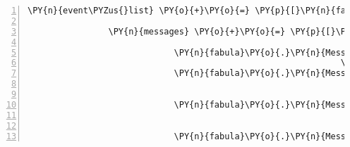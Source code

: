 \begin{Verbatim}[commandchars=\\\{\},numbers=left,firstnumber=1,stepnumber=1]
                \PY{n}{event\PYZus{}list} \PY{o}{+}\PY{o}{=} \PY{p}{[}\PY{n}{fabula}\PY{o}{.}\PY{n}{PerceptionEvent}\PY{p}{(}\PY{n}{identifier}\PY{o}{=}\PY{n}{ID\PYZus{}KUNI}\PY{p}{,} \PY{n}{perception}\PY{o}{=}\PY{l+s}{\PYZsq{}}\PY{l+s}{Cassandra nimmt die Seite der Harfe.}\PY{l+s}{\PYZsq{}}\PY{p}{)}\PY{p}{]}

                \PY{n}{messages} \PY{o}{+}\PY{o}{=} \PY{p}{[}\PY{n}{fabula}\PY{o}{.}\PY{n}{Message}\PY{p}{(}\PY{p}{[}\PY{n}{fabula}\PY{o}{.}\PY{n}{PerceptionEvent}\PY{p}{(}\PY{n}{identifier}\PY{o}{=}\PY{n}{ID\PYZus{}CASSANDRA}\PY{p}{,}
                                                                    \PY{n}{perception}\PY{o}{=}\PY{l+s}{\PYZsq{}}\PY{l+s}{Kuni gibt dir die Saite einer Harfe.}\PY{l+s}{\PYZsq{}}\PY{p}{)}\PY{p}{]}\PY{p}{)}\PY{p}{,}
                             \PY{n}{fabula}\PY{o}{.}\PY{n}{Message}\PY{p}{(}\PY{p}{[}\PY{n}{fabula}\PY{o}{.}\PY{n}{SaysEvent}\PY{p}{(}\PY{n}{identifier}\PY{o}{=}\PY{n}{ID\PYZus{}CASSANDRA}\PY{p}{,}
                                                              \PY{n}{text}\PY{o}{=}\PY{l+s}{\PYZsq{}}\PY{l+s}{Moment mal, ich hab da eine Idee!}\PY{l+s}{\PYZsq{}}\PY{p}{)}\PY{p}{]}\PY{p}{)}\PY{p}{,}
                             \PY{n}{fabula}\PY{o}{.}\PY{n}{Message}\PY{p}{(}\PY{p}{[}\PY{n}{fabula}\PY{o}{.}\PY{n}{DropsEvent}\PY{p}{(}\PY{n}{ID\PYZus{}KUNI}\PY{p}{,}
                                                               \PY{n+nb+bp}{self}\PY{o}{.}\PY{n}{host}\PY{o}{.}\PY{n}{rack}\PY{o}{.}\PY{n}{entity\PYZus{}dict}\PY{p}{[}\PY{l+s}{\PYZsq{}}\PY{l+s}{string\PYZus{}harp}\PY{l+s}{\PYZsq{}}\PY{p}{]}\PY{p}{,}
                                                               \PY{n}{room}\PY{o}{.}\PY{n}{entity\PYZus{}locations}\PY{p}{[}\PY{n}{ID\PYZus{}CASSANDRA}\PY{p}{]}\PY{p}{)}\PY{p}{]}\PY{p}{)}\PY{p}{,}
                             \PY{n}{fabula}\PY{o}{.}\PY{n}{Message}\PY{p}{(}\PY{p}{[}\PY{n}{fabula}\PY{o}{.}\PY{n}{DropsEvent}\PY{p}{(}\PY{n}{ID\PYZus{}CASSANDRA}\PY{p}{,}
                                                               \PY{n+nb+bp}{self}\PY{o}{.}\PY{n}{host}\PY{o}{.}\PY{n}{rack}\PY{o}{.}\PY{n}{entity\PYZus{}dict}\PY{p}{[}\PY{l+s}{\PYZsq{}}\PY{l+s}{lute\PYZus{}broken}\PY{l+s}{\PYZsq{}}\PY{p}{]}\PY{p}{,}
                                                               \PY{n}{room}\PY{o}{.}\PY{n}{entity\PYZus{}locations}\PY{p}{[}\PY{n}{ID\PYZus{}CASSANDRA}\PY{p}{]}\PY{p}{)}\PY{p}{]}\PY{p}{)}\PY{p}{,}
                             \PY{n}{fabula}\PY{o}{.}\PY{n}{Message}\PY{p}{(}\PY{p}{[}\PY{n}{fabula}\PY{o}{.}\PY{n}{DeleteEvent}\PY{p}{(}\PY{n}{identifier}\PY{o}{=}\PY{l+s}{\PYZsq{}}\PY{l+s}{string\PYZus{}harp}\PY{l+s}{\PYZsq{}}\PY{p}{)}\PY{p}{]}\PY{p}{)}\PY{p}{,}

\end{Verbatim}
